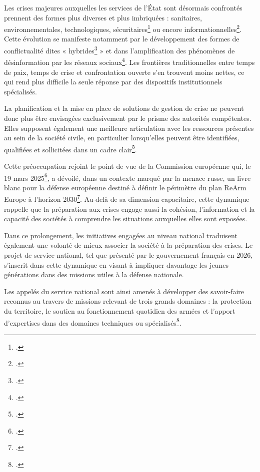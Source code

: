 \documentclass[12pt,a4paper]{article}
\begin{document}
Les crises majeures auxquelles les services de l'État sont désormais confrontés prennent des formes plus diverses et plus imbriquées : sanitaires, environnementales, technologiques, sécuritaires\footcite{AN:2022:Resilience_nationale} ou encore informationnelles\footcite[3]{SciencesPo:2025:Resilience_menaces_informationnelles}.
Cette évolution se manifeste notamment par le développement des formes de conflictualité dites « hybrides\footcite{tenenbaum2016guerre} » et dans l'amplification des phénomènes de désinformation par les réseaux sociaux\footcite{garrigou2025desinformation}. Les frontières traditionnelles entre temps de paix, temps de crise et confrontation ouverte s'en trouvent moins nettes, ce qui rend plus difficile la seule réponse par des dispositifs institutionnels spécialisés.

La planification et la mise en place de solutions de gestion de crise ne peuvent donc plus être envisagées exclusivement par le prisme des autorités compétentes. Elles supposent également une meilleure articulation avec les ressources présentes au sein de la société civile, en particulier lorsqu'elles peuvent être identifiées, qualifiées et sollicitées dans un cadre clair\footcite{AN:2022:Resilience_nationale}.

\clearpage

Cette préoccupation rejoint le point de vue de la Commission européenne qui, le 19 mars 2025\footcite{burgdorff2025livreblanc}, a dévoilé, dans un contexte marqué par la menace russe, un livre blanc pour la défense européenne destiné à définir le périmètre du plan ReArm Europe à l'horizon 2030\footcite{viepublique2025livreblanc}. Au-delà de sa dimension capacitaire, cette dynamique rappelle que la préparation aux crises engage aussi la cohésion, l'information et la capacité des sociétés à comprendre les situations auxquelles elles sont exposées.

Dans ce prolongement, les initiatives engagées au niveau national traduisent également une volonté de mieux associer la société à la préparation des crises. Le projet de service national, tel que présenté par le gouvernement français en 2026, s'inscrit dans cette dynamique en visant à impliquer davantage les jeunes générations dans des missions utiles à la défense nationale.

Les appelés du service national sont ainsi amenés à développer des savoir-faire reconnus au travers de missions relevant de trois grands domaines : la protection du territoire, le soutien au fonctionnement quotidien des armées et l'apport d'expertises dans des domaines techniques ou spécialisés\footcite{info_gouv_service_national}.
\end{document}

